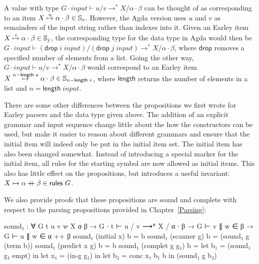 \newcommand{\tdrop}{\mathsf{drop}}
\newcommand{\tlength}{\mathsf{length}}
\newcommand{\vinput}{\mathit{input}}
\newcommand{\rslash}{\mathrel{{}/{}}}


		A value with type $G \cdot \vinput \vdash u \rslash v \rightarrow^* X
		\rslash \alpha \cdot \beta$ can be thought of as corresponding to an
		item $X\overset{u}{\mapsto}\alpha\cdot\beta \in \mathbb{S}_{v}$. However, the Agda
		version uses $u$ and $v$ as remainders of the input string rather than
		indexes into it.  Given an Earley item {$X\overset{i}{\mapsto}\alpha\cdot\beta
		\in \mathbb{S}_{j}$, the corresponding type for the data type in Agda would then
		be $G \cdot \vinput \vdash (\tdrop\;i\;\vinput) \rslash
		(\tdrop\;j\;\vinput) \rightarrow^* X \rslash \alpha \cdot \beta$, where
		$\tdrop$ removes a specified number of elements from a list. Going the
		other way, $G \cdot \vinput \vdash u \rslash v \rightarrow^* X \rslash
		\alpha \cdot \beta$ would correspond to an Earley item
		$\earley{X}{\alpha}{\beta}{n - \tlength\;u} \in \St{n - \tlength\;v}$},
		where $\tlength$ returns the number of elements in a list and $n =
		\tlength\;\vinput$.

		There are some other differences between the propositions we first
		wrote for Earley parsers and the data type given above. The addition of
		an explicit grammar and input sequence change little about the how the
		constructors can be used, but make it easier to reason about different
		grammars and ensure that the initial item will indeed only be put in
		the initial item set. The initial item has also been changed somewhat.
		Instead of introducing a special marker for the initial item, all rules
		for the starting symbol are now allowed as initial items.  This also
		has little effect on the propositions, but introduces a useful
		invariant: $X \mapsto \alpha \mathbin{{+}\mspace{-8mu}{+}} \beta \in \textsf{rules } G$.

		We also provide proofs that these propositions are sound and complete
		with respect to the parsing propositions provided in
		Chapter~\ref{Parsing}:

		\begin{code}
			sound₁ : ∀ {G t u v w X α β} →
			  G ∙ t ⊢ u / v ⟶* X / α ∙ β →
			    G ⊢ v ∥ w ∈ β →
			    G ⊢ u ∥ w ∈ α ++ β
			sound₁ (initial x)     b = b
			sound₁ (scanner g)     b = (sound₁ g (term b))
			sound₁ (predict x g)   b = b
			sound₁ (complet g g₁)  b =
			  let b₁ = (sound₁ g₁ empt) in
			  let x₁ = (in-g g₁) in
			  let b₂ = conc x₁ b₁ b in
			  (sound₁ g b₂)
		\end{code}
		
